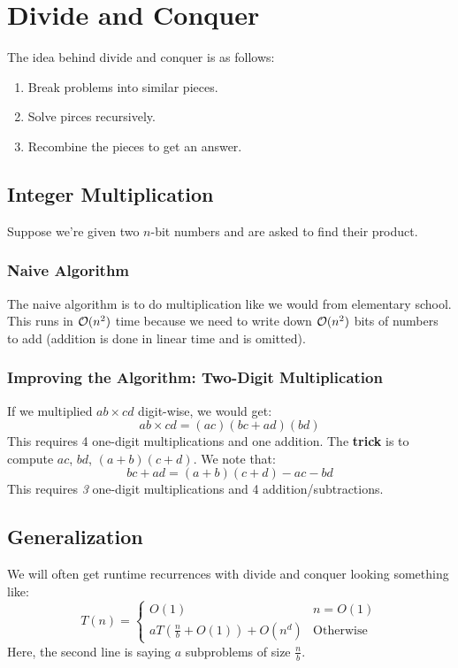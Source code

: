 \documentclass[letterpaper]{article}
\begin{document}
\section{Divide and Conquer}
The idea behind divide and conquer is as follows: 
\begin{enumerate}
    \item Break problems into similar pieces. 
    \item Solve pirces recursively. 
    \item Recombine the pieces to get an answer.
\end{enumerate}

\subsection{Integer Multiplication}
Suppose we're given two $n$-bit numbers and are asked to find their product. 

\subsubsection{Naive Algorithm}
The naive algorithm is to do multiplication like we would from elementary school. This runs in $\mathcal{O}(n^2)$ time because we need to write down $\mathcal{O}(n^2)$ bits of numbers to add (addition is done in linear time and is omitted).

\subsubsection{Improving the Algorithm: Two-Digit Multiplication}
If we multiplied $ab \times cd$ digit-wise, we would get: 
\[ab \times cd = (ac)(bc + ad)(bd)\]
This requires 4 one-digit multiplications and one addition. The \textbf{trick} is to compute $ac$, $bd$, $(a + b)(c + d)$. We note that: 
\[bc + ad = (a + b)(c + d) - ac - bd\]
This requires \emph{3} one-digit multiplications and 4 addition/subtractions.


\subsection{Generalization}
We will often get runtime recurrences with divide and conquer looking something like: 
\[T(n) = \begin{cases}
    O(1) & n = O(1) \\ 
    aT\left(\frac{n}{b} + O(1)\right) + O(n^d) & \text{Otherwise}
\end{cases}\]
Here, the second line is saying $a$ subproblems of size $\frac{n}{b}$. 
\end{document}

